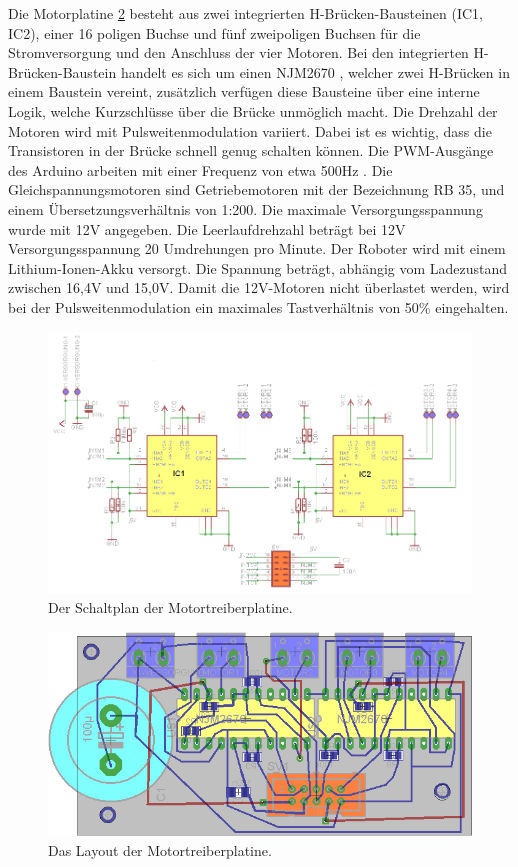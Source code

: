 \documentclass[a4paper,bibtotoc,oneside]{scrbook}
\begin{document}
Die Motorplatine \ref{hbridge2} besteht aus zwei integrierten H-Brücken-Bausteinen (IC1, IC2), einer 16 poligen Buchse und fünf zweipoligen Buchsen für die Stromversorgung und den Anschluss der vier Motoren. Bei den integrierten H-Brücken-Baustein handelt es sich um einen NJM2670 \cite{njm}, welcher zwei H-Brücken in einem Baustein vereint, zusätzlich verfügen diese Bausteine über eine interne Logik, welche Kurzschlüsse über die Brücke unmöglich macht.
Die Drehzahl der Motoren wird mit Pulsweitenmodulation variiert. Dabei ist es wichtig, dass die Transistoren in der Brücke schnell genug schalten können. Die PWM-Ausgänge des Arduino arbeiten mit einer Frequenz von etwa 500Hz \cite{pwm}.
Die Gleichspannungsmotoren sind Getriebemotoren mit der Bezeichnung RB 35, und einem Übersetzungsverhältnis von 1:200. Die maximale Versorgungsspannung wurde mit 12V angegeben. Die Leerlaufdrehzahl beträgt bei 12V Versorgungsspannung 20 Umdrehungen pro Minute.
Der Roboter wird mit einem Lithium-Ionen-Akku versorgt. Die Spannung beträgt, abhängig vom Ladezustand zwischen 16,4V und 15,0V. Damit die 12V-Motoren nicht überlastet werden, wird bei der Pulsweitenmodulation ein maximales Tastverhältnis von 50\% eingehalten.
 

\begin{figure}[htbp]
\centering
\includegraphics[width=150mm]{img/HBrucke.png}
\caption{Der Schaltplan der Motortreiberplatine.}\label{hbridge2}
\end{figure}

\begin{figure}[htbp]
\centering
\includegraphics[width=125mm]{img/hdrive.png}
\caption{Das Layout der Motortreiberplatine.}\label{hbridge2}
\end{figure}
\end{document}
